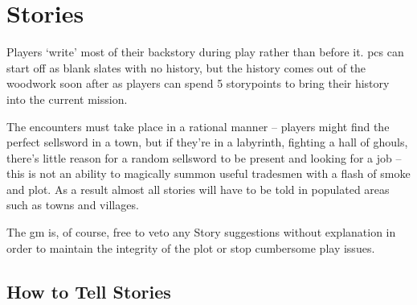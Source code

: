 \chapter[House of Stories]{Stories}
\label{stories}


Players `write' most of their backstory during play rather than before it.
\Glspl{pc} can start off as blank slates with no history, but the history comes out of the woodwork soon after as players can spend 5 \glspl{storypoint} to bring their history into the current mission.

The encounters must take place in a rational manner -- players might find the perfect sellsword in a town, but if they're in a labyrinth, fighting a hall of ghouls, there's little reason for a random sellsword to be present and looking for a job -- this is not an ability to magically summon useful tradesmen with a flash of smoke and plot.
As a result almost all stories will have to be told in populated areas such as towns and villages.

The \gls{gm} is, of course, free to veto any Story suggestions without explanation in order to maintain the integrity of the plot or stop cumbersome play issues.

\section{How to Tell Stories}

